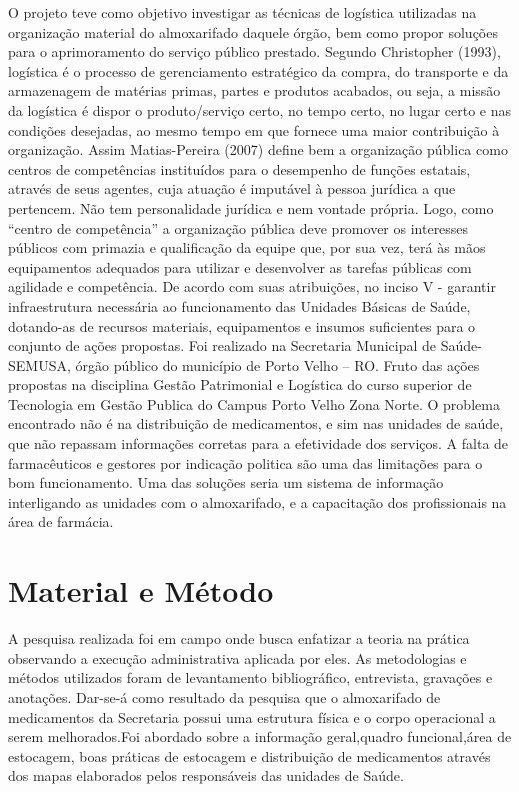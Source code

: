 \documentclass[article,12pt,onesidea,4paper,english,brazil]{abntex2}
\begin{document}
O projeto teve como objetivo investigar as técnicas de logística utilizadas na organização material do almoxarifado daquele órgão, bem como propor soluções para o aprimoramento do serviço público prestado. Segundo Christopher (1993), logística é o processo de gerenciamento estratégico da compra, do transporte e da armazenagem de matérias primas, partes e produtos acabados, ou seja, a missão da logística é dispor o produto/serviço certo, no tempo certo, no lugar certo e nas condições desejadas, ao mesmo tempo em que fornece uma maior contribuição à organização. Assim Matias-Pereira (2007) define bem a organização pública como centros de competências instituídos para o desempenho de funções estatais,  através de seus agentes, cuja atuação é imputável à pessoa jurídica a que pertencem. Não tem personalidade jurídica e nem vontade própria. Logo, como “centro de competência” a organização pública deve promover os interesses públicos com primazia e qualificação da equipe que, por sua vez, terá às mãos equipamentos adequados para utilizar e desenvolver as tarefas públicas com agilidade e competência. De acordo com suas atribuições, no inciso V - garantir infraestrutura necessária ao funcionamento das Unidades Básicas de Saúde, dotando-as de recursos materiais, equipamentos e insumos suficientes para o conjunto de ações propostas. Foi realizado na Secretaria Municipal de Saúde- SEMUSA, órgão público do município de Porto Velho – RO. Fruto das ações propostas na disciplina Gestão Patrimonial e Logística do curso superior de Tecnologia em Gestão Publica do Campus Porto Velho Zona Norte. O problema encontrado não é na distribuição de medicamentos, e sim nas unidades de saúde, que não repassam informações corretas para a efetividade dos serviços. A falta de farmacêuticos e gestores por indicação politica são uma das limitações para o bom funcionamento. Uma das soluções seria um sistema de informação interligando as unidades com o almoxarifado, e a capacitação dos profissionais na área de  farmácia.

\section*{Material e Método}

A pesquisa realizada foi em campo onde busca enfatizar a teoria na prática observando a execução administrativa aplicada por eles. As metodologias e  métodos utilizados foram de levantamento bibliográfico, entrevista, gravações e anotações. Dar-se-á como resultado da pesquisa que o almoxarifado de medicamentos da Secretaria possui uma estrutura física e o corpo operacional a serem melhorados.Foi abordado sobre a informação geral,quadro funcional,área de estocagem, boas práticas de estocagem e distribuição de medicamentos através dos mapas elaborados pelos responsáveis das unidades de Saúde.
\end{document}
